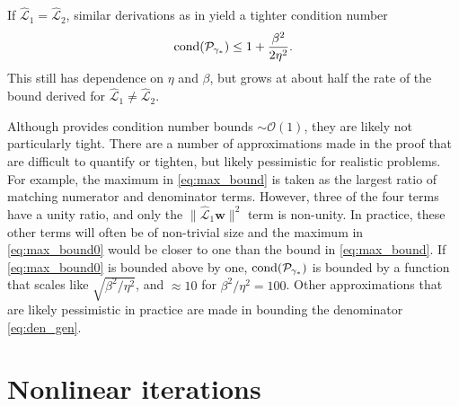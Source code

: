 \documentclass[review]{siamart}
\makeatletter
\newcommand{\todo}[1]{\textcolor{red}{[TODO\@: #1]}}
\makeatother
\begin{document}
%
\begin{remark}[$\widehat{\mathcal{L}}_1 = \widehat{\mathcal{L}}_2$]
If $\widehat{\mathcal{L}}_1 = \widehat{\mathcal{L}}_2$, similar derivations as in
 yield a tighter condition number
\begin{align*}
\textnormal{cond}(\mathcal{P}_{\gamma_*}) \leq
	1+\frac{\beta^2}{2\eta^2}.
\end{align*}
This still has dependence on $\eta$ and $\beta$, but grows at about half the rate
of the bound derived for $\widehat{\mathcal{L}}_1 \neq \widehat{\mathcal{L}}_2$.
\end{remark}
%

%
\begin{remark}
Although  provides condition number bounds $\sim\mathcal{O}(1)$, they
are likely not particularly tight. There are a number of approximations made in the
proof that are difficult to quantify or tighten, but likely pessimistic for realistic
problems. For example,
the maximum in \eqref{eq:max_bound} is taken as the largest ratio of matching numerator
and denominator terms. However, three of the four terms have a unity ratio, and only
the $\|\widehat{\mathcal{L}}_1\mathbf{w}\|^2$ term is non-unity. In practice, these
other terms will often be of non-trivial size and the maximum in \eqref{eq:max_bound0}
would be closer to one than the bound in \eqref{eq:max_bound}. If \eqref{eq:max_bound0}
is bounded above by one, $\textnormal{cond}(\mathcal{P}_{\gamma_*})$ is bounded
by a function that scales like $\sqrt{\beta^2/\eta^2}$, and $\approx 10$ for
$\beta^2/\eta^2 = 100$. Other approximations that are likely pessimistic in practice
are made in bounding the denominator \eqref{eq:den_gen}.
\end{remark}
%


\section{Nonlinear iterations}\label{sec:nonlinear}

\end{document}
